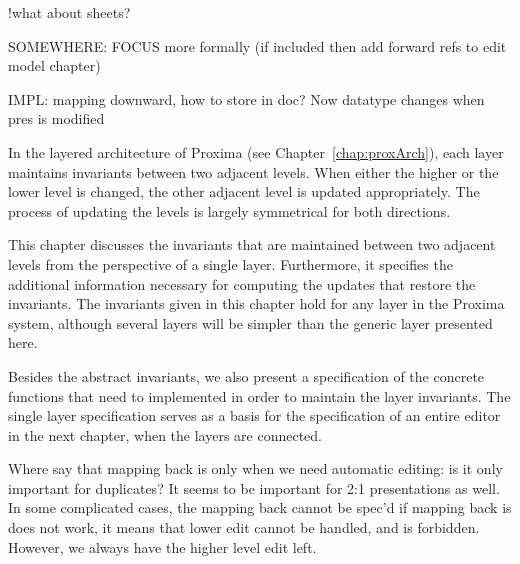 !what about sheets? 

SOMEWHERE: FOCUS more formally (if included then add forward refs to edit model chapter)


IMPL: mapping downward, how to store in doc? Now datatype changes when pres is modified

\ec



In the layered architecture of Proxima (see Chapter~\ref{chap:proxArch}), each layer maintains invariants between two adjacent levels. When either the higher or the lower level is changed, the other adjacent level is updated appropriately. The process of updating the levels is largely symmetrical for both directions.

This chapter discusses the invariants that are maintained between two adjacent levels from the perspective of a single layer. Furthermore, it specifies the additional information necessary for computing the updates that restore the invariants. The invariants given in this chapter hold for any layer in the Proxima system, although several layers will be simpler than the generic layer presented here.

Besides the abstract invariants, we also present a specification of the concrete functions that need to implemented in order to maintain the layer invariants. The single layer specification serves as a basis for the specification of an entire editor in the next chapter, when the layers are connected.




\bc
Where say that mapping back is only when we need automatic editing: is it only important for duplicates? It seems to be important for 2:1 presentations as well.  In some complicated cases, the mapping back cannot be spec'd if mapping back is does not work, it means that lower edit cannot be handled, and is forbidden. However, we always have the higher level edit left.
\ec

%																
%																
%																
